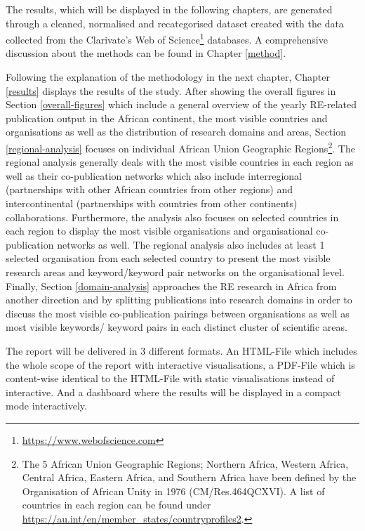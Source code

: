 \documentclass[
]{book}
\renewcommand{\href}[2]{#2\footnote{\url{#1}}}
\begin{document}
The results, which will be displayed in the following chapters, are generated through a cleaned, normalised and recategorised dataset created with the data collected from the \href{https://www.webofscience.com}{Clarivate's Web of Science} databases. A comprehensive discussion about the methods can be found in Chapter \ref{method}.

Following the explanation of the methodology in the next chapter, Chapter \ref{results} displays the results of the study. After showing the overall figures in Section \ref{overall-figures} which include a general overview of the yearly RE-related publication output in the African continent, the most visible countries and organisations as well as the distribution of research domains and areas, Section \ref{regional-analysis} focuses on individual African Union Geographic Regions\footnote{The 5 African Union Geographic Regions; Northern Africa, Western Africa, Central Africa, Eastern Africa, and Southern Africa have been defined by the Organisation of African Unity in 1976 (CM/Res.464QCXVI). A list of countries in each region can
  be found under \url{https://au.int/en/member_states/countryprofiles2}.}. The regional analysis generally deals with the most visible countries in each region as well as their co-publication networks which also include interregional (partnerships with other African countries from other regions) and intercontinental (partnerships with countries from other continents) collaborations. Furthermore, the analysis also focuses on selected countries in each region to display the most visible organisations and organisational co-publication networks as well. The regional analysis also includes at least 1 selected organisation from each selected country to present the most visible research areas and keyword/keyword pair networks on the organisational level. Finally, Section \ref{domain-analysis} approaches the RE research in Africa from another direction and by splitting publications into research domains in order to discuss the most visible co-publication pairings between organisations as well as most visible keywords/ keyword pairs in each distinct cluster of scientific areas.

The report will be delivered in 3 different formats. An HTML-File which includes the whole scope of the report with interactive visualisations, a PDF-File which is content-wise identical to the HTML-File with static visualisations instead of interactive. And a dashboard where the results will be displayed in a compact mode interactively.
\end{document}
